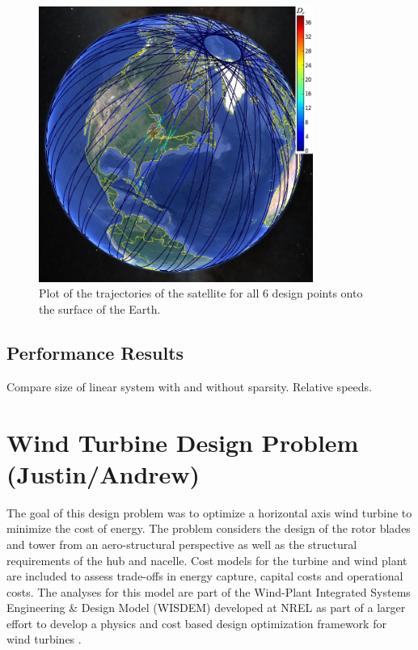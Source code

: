 \documentclass[]{aiaa-tc} %
\begin{document}
        \begin{figure}
        \centering
        \includegraphics[width=0.8\textwidth]{images/allpts_gearth2}
        \caption[width=0.4\textwidth]{Plot of the trajectories of the satellite
        for all 6 design points onto the surface of the Earth.
        \label{allpt_g_earth}
        }

        \end{figure}

        \subsection{Performance Results}
            Compare size of linear system with and without sparsity. Relative speeds.


  \section{Wind Turbine Design Problem (Justin/Andrew)}

    The goal of this design problem was to optimize a horizontal axis wind turbine to minimize the cost of energy. The problem considers the design of the rotor blades and tower from an aero-structural perspective as well as the structural requirements of the hub and nacelle.  Cost models for the turbine and wind plant are included to assess trade-offs in energy capture, capital costs and operational costs.  The analyses for this model are part of the Wind-Plant Integrated Systems Engineering \& Design Model (WISDEM) developed at NREL as part of a larger effort to develop a physics and cost based design optimization framework for wind turbines  \cite{Dykes2014a, ning2014, ning2014}.
\end{document}
